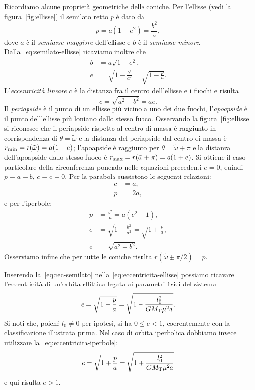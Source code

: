 Ricordiamo alcune proprietà geometriche delle coniche. Per l'ellisse (vedi la
figura~\ref{fig:ellisse}) il semilato retto $p$ è dato da
\begin{equation}
  \label{eq:semilato-ellisse}
  p = a(1-e^2) = \frac{b^2}{a},
\end{equation}
dove $a$ è il \emph{semiasse maggiore} dell'ellisse e $b$ è il \emph{semiasse
  minore}. Dalla~\eqref{eq:semilato-ellisse} ricaviamo inoltre che
\begin{align}
  b &= a\sqrt{1-e^2},\\
  e &= \sqrt{1-\frac{b^2}{a^2}} =
  \sqrt{1-\frac{p}{a}}. \label{eq:eccentricita-ellisse}
\end{align}
L'\emph{eccentricità lineare} $c$ è la distanza fra il centro dell'ellisse e i
fuochi e risulta
\begin{equation}
  c=\sqrt{a^2-b^2} = ae.
\end{equation}
Il \emph{periapside} è il punto di un ellisse più vicino a uno dei due fuochi,
l'\emph{apoapside} è il punto dell'ellisse più lontano dallo stesso
fuoco. Osservando la figura~\ref{fig:ellisse} si riconosce che il periapside
rispetto al centro di massa è raggiunto in corrispondenza di
$\theta=\tilde\omega$ e la distanza del periapside dal centro di massa è
$r_\textup{min} = r(\tilde\omega) = a(1-e)$; l'apoapside è raggiunto per
$\theta=\tilde\omega+\pi$ e la distanza dell'apoapside dallo stesso fuoco è
$r_\textup{max} = r(\tilde\omega+\pi) = a(1+e)$. Si ottiene il caso particolare
della circonferenza ponendo nelle equazioni precedenti $e=0$, quindi $p=a=b$,
$c=e=0$. Per la parabola sussistono le seguenti relazioni:
\begin{align}
  c &= a,\\
  p &= 2a,
\end{align}
e per l'iperbole:
\begin{align}
  p &= \frac{b^2}{a} = a(e^2-1), \label{eq:semilato-iperbole}\\
  e &= \sqrt{1+\frac{b^2}{a^2}} =
  \sqrt{1+\frac{p}{a}}, \label{eq:eccentricita-iperbole}\\
  c &= \sqrt{a^2+b^2}.
\end{align}
Osserviamo infine che per tutte le coniche risulta $r(\tilde\omega\pm\pi/2)=p$.

Inserendo la~\eqref{eq:rec-semilato} nella~\eqref{eq:eccentricita-ellisse}
possiamo ricavare l'eccentricità di un'orbita ellittica legata ai parametri
fisici del sistema
\begin{equation}
  \label{eq:eccentricita-orbita-ellisse}
  e = \sqrt{1-\frac{p}{a}} = \sqrt{1-\frac{l_0^2}{GM_\textup{T}\mu^2a}}.
\end{equation}
Si noti che, poiché $l_0\neq 0$ per ipotesi, si ha $0\leq e<1$, coerentemente
con la classificazione illustrata prima. Nel caso di orbita iperbolica dobbiamo
invece utilizzare la~\eqref{eq:eccentricita-iperbole}:
\begin{equation}
  \label{eq:eccentricita-orbita-iperbole}
  e = \sqrt{1+\frac{p}{a}} = \sqrt{1+\frac{l_0^2}{GM_\textup{T}\mu^2a}}
\end{equation}
e qui risulta $e>1$.

